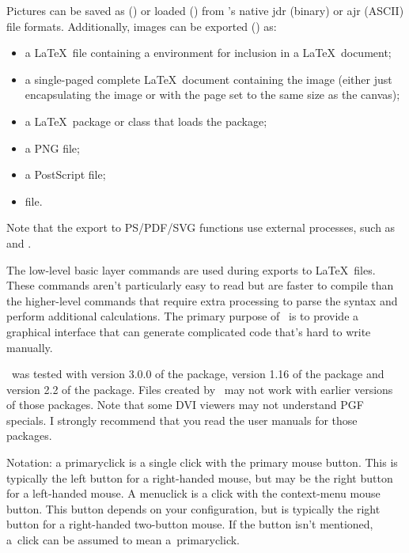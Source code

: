    Pictures can be saved as () or loaded
   () from \appname's native \gls{jdr}
   (binary) or \gls{ajr} (ASCII) file formats. Additionally, images can be
   exported () as:

   \begin{itemize}
    \item a \LaTeX\ file containing a  environment
    for inclusion in a \LaTeX\ document;

    \item a single-paged complete \LaTeX\ document containing the image
    (either just encapsulating the image or with the page set to the
    same size as the \gls{canvas});

    \item a \LaTeX\ package or class that loads the  package;

    \item a PNG file;

    \item a PostScript file;

    \item {} file.
   \end{itemize}

   Note that the export to PS/PDF/SVG functions use external
   processes, such as  and .

   The low-level  basic layer commands are used during
   exports to \LaTeX\ files. These commands aren't particularly easy to
   read but are faster to compile than the higher-level commands that
   require extra processing to parse the syntax and perform additional
   calculations. The primary purpose of \appname\ is to provide a
   graphical interface that can generate complicated code that's hard
   to write manually.

   \appname\ was tested with version 3.0.0 of the 
   package, version 1.16 of the  package and version
   2.2 of the  package. Files created by \appname\
   may not work with earlier versions of those packages. Note that some
   DVI viewers may not understand PGF specials. I strongly recommend
   that you read the user manuals for those packages.


   Notation: a \gls{primaryclick} is a single click with the primary
   mouse button. This is typically the left button for a right-handed
   mouse, but may be the right button for a left-handed mouse. A
   \gls{menuclick} is a click with the context-menu mouse button. This
   button depends on your configuration, but is typically the right
   button for a right-handed two-button mouse. If the button isn't
   mentioned, a~\gls{click} can be assumed to mean 
   a~\gls{primaryclick}.


